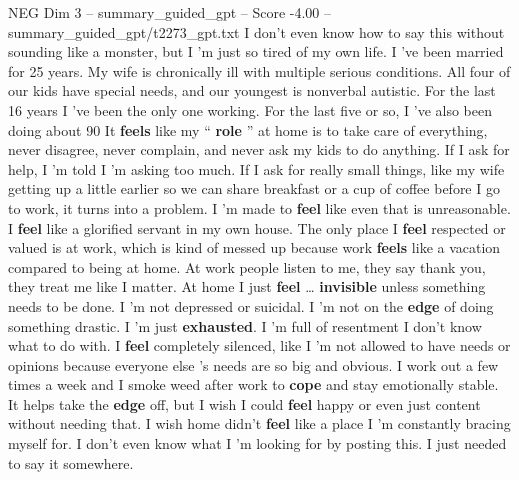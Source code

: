 \begin{textsample}{NEG Dim 3 – summary\_guided\_gpt – Score -4.00 – summary\_guided\_gpt/t2273\_gpt.txt}  \label{ex:f3_neg_021}
I don't even know how to say this without sounding like a monster, but I ’m just so tired of my own life.
I ’ve been married for 25 years.
My wife is chronically ill with multiple serious conditions.
All four of our kids have special needs, and our youngest is nonverbal autistic.
For the last 16 years I ’ve been the only one working.
For the last five or so, I ’ve also been doing about 90 %
It \textbf{feels} like my “ \textbf{role} ” at home is to take care of everything, never disagree, never complain, and never ask my kids to do anything.
If I ask for help, I ’m told I ’m asking too much.
If I ask for really small things, like my wife getting up a little earlier so we can share breakfast or a cup of coffee before I go to work, it turns into a problem.
I ’m made to \textbf{feel} like even that is unreasonable.
I \textbf{feel} like a glorified servant in my own house.
The only place I \textbf{feel} respected or valued is at work, which is kind of messed up because work \textbf{feels} like a vacation compared to being at home.
At work people listen to me, they say thank you, they treat me like I matter.
At home I just \textbf{feel} … \textbf{invisible} unless something needs to be done.
I ’m not depressed or suicidal.
I ’m not on the \textbf{edge} of doing something drastic.
I ’m just \textbf{exhausted}.
I ’m full of resentment I don't know what to do with.
I \textbf{feel} completely silenced, like I ’m not allowed to have needs or opinions because everyone else ’s needs are so big and obvious.
I work out a few times a week and I smoke weed after work to \textbf{cope} and stay emotionally stable.
It helps take the \textbf{edge} off, but I wish I could \textbf{feel} happy or even just content without needing that.
I wish home didn't \textbf{feel} like a place I ’m constantly bracing myself for.
I don't even know what I ’m looking for by posting this.
I just needed to say it somewhere.

\end{textsample}

